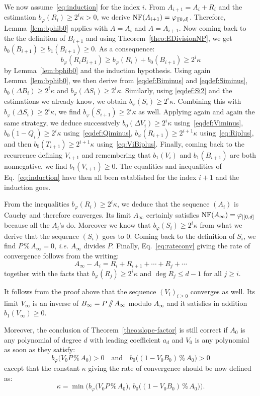 \documentclass{sig-alternate-2013}
\newcommand{\NF}{\text{\rm NF}}
\renewcommand{\mod}{\,\%\,}
\renewcommand{\div}{\,/\hspace{-0.3em}/\,}
\begin{document}
We now assume~\eqref{eq:induction} for the index $i$.
From $A_{i+1} = A_i + R_i$ and the estimation $b_\varphi(R_i) \geq 2^i 
\kappa > 0$, we derive $\NF(A_{i+1}) = \varphi_{|[0,d]}$. Therefore,
Lemma~\ref{lem:bphib0} applies with $A = A_i$ and $A = A_{i+1}$.
Now coming back to the the definition of $B_{i+1}$ and using
Theorem~\ref{theo:EDivisionNP}, we get $b_0(B_{i+1}) \geq b_1(B_{i+1}) 
\geq 0$. As a consequence:
$$b_\varphi(R_i B_{i+1}) \geq b_\varphi(R_i) + b_0(B_{i+1})
\geq 2^i \kappa$$
by Lemma~\ref{lem:bphib0} and the induction hypothesis.
Using again Lemma~\ref{lem:bphib0}, we then derive from 
\eqref{eqdef:Biminus} and \eqref{eqdef:Siminus}, $b_0(\Delta B_i) \geq 
2^i \kappa$ and $b_\varphi(\Delta S_i) \geq 2^i \kappa$.
Similarly, using \eqref{eqdef:Si2} and the estimations we already know,
we obtain $b_\varphi(S_i) \geq 2^i \kappa$. Combining this with
$b_\varphi(\Delta S_i) \geq 2^i \kappa$, we find
$b_\varphi(S_{i+1}) \geq 2^i \kappa$ as well. Applying again and again
the same strategy, we deduce successively
$b_0(\Delta V_i) \geq 2^i \kappa$ using~\eqref{eqdef:Viminus},
$b_0(1{-}Q_i) \geq 2^i \kappa$ using~\eqref{eqdef:Qiminus},
$b_\varphi(R_{i+1}) \geq 2^{i+1} \kappa$ using~\eqref{eq:Riplus},
and then $b_0(T_{i+1}) \geq 2^{i+1} \kappa$
using~\eqref{eq:ViBiplus}. Finally, coming back to the recurrence
defining $V_{i+1}$ and remembering that $b_1(V_i)$ and $b_1(B_{i+1})$
are both nonnegative, we find $b_1(V_{i+1}) \geq 0$.
The equalities and inequalities
of Eq.~\eqref{eq:induction} have then all been established for
the index $i+1$ and the induction goes.

From the inequalities $b_\varphi(R_i) \geq 2^i \kappa$, we deduce that 
the sequence $(A_i)$ is Cauchy and therefore converges. Its limit 
$A_\infty$ certainly satisfies $\NF(A_\infty) = \varphi_{|[0,d]}$ because 
all the $A_i$'s do. Moreover we know that $b_\varphi(S_i) \geq 2^i 
\kappa$ from what we derive that the sequence $(S_i)$ goes to $0$.
Coming back to the definition of $S_i$, we find $P \mod A_\infty = 0$,
\emph{i.e.} $A_\infty$ divides $P$. Finally, Eq.~\eqref{eq:rateconv}
giving the rate of convergence follows from the writing:
$$A_\infty - A_i = R_i + R_{i+1} + \cdots + R_j + \cdots$$
together with the facts that $b_\varphi(R_j) \geq 2^i \kappa$ and $\deg 
R_j \leq d{-}1$ for all $j \geq i$.

\begin{rem}
\label{rem:slope-factor}
It follows from the proof above that the sequence $(V_i)_{i \geq 0}$
converges as well. Its limit $V_\infty$ is an inverse of $B_\infty
= P \div A_\infty$ modulo $A_\infty$ and it satisfies in addition
$b_1(V_\infty) \geq 0$.

Moreover, the conclusion of 
Theorem~\ref{theo:slope-factor} is still correct if $A_0$ is any 
polynomial of degree $d$ with leading coefficient $a_d$ and $V_0$
is any polynomial as soon as they satisfy:
$$b_\varphi\big(V_0 P \mod A_0\big) > 0
\quad \text{and} \quad
b_0\big((1 - V_0 B_0) \mod A_0\big) > 0$$
except that the constant $\kappa$ giving the rate of convergence
should be now defined as:
$$\kappa = \min \big( 
b_\varphi\big(V_0 P \mod A_0\big), \,
b_0\big((1 - V_0 B_0) \mod A_0\big)\big).$$
\end{rem}
\end{document}
